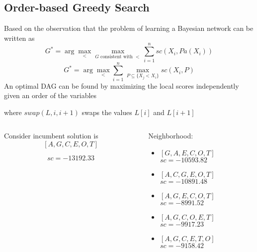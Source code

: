 \subsection{Order-based Greedy Search}
	\begin{frame}
		Based on the observation that the problem of learning a Bayesian network can be written as
			\[ G^* = \arg \max_{<} \max_{G \text{ consistent with } <} \sum_{i=1}^{n} {sc}( X_i , {Pa}( X_i ) ) \]
			\[ G^* = \arg \max_{<} \sum_{i=1}^{n} \max_{P \subseteq \{ X_j < X_i \}} {sc}( X_i , P ) \]
		An optimal DAG can be found by maximizing the local scores \alert{independently} given an order of the variables
	\end{frame}
	
	\begin{frame}
		
		where ${swap}( L , i , i + 1 )$ swaps the values $L[ i ]$ and $L[ i + 1 ]$
	\end{frame}
	
	\begin{frame}[fragile]
		\begin{columns}
			\begin{column}{.5\linewidth}
				Consider incumbent solution is
					\[ [ A , G , C , E , O , T ] \]
				\begin{figure}
					\centering
					
				\end{figure}
				\[ {sc} = -13192.33 \]
			\end{column}
			\begin{column}{.4\linewidth}
				Neighborhood:
				\begin{itemize}
					\item $[ G , A , E , C , O , T ]$\\$sc = -10593.82$
					\item $[ A , C , G , E , O , T ]$\\$sc = -10891.48$
					\item \alert{$[ A , G , E , C , O , T ]$\\$sc = -8991.52$}
					\item $[ A , G , C , O , E , T ]$\\$sc = -9917.23$
					\item $[ A , G , C , E , T , O ]$\\$sc = -9158.42$
				\end{itemize}
			\end{column}
		\end{columns}
	\end{frame}
	
